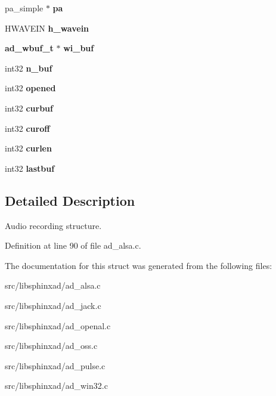 \begin{DoxyCompactItemize}
\item 
pa\-\_\-simple $\ast$ {\bfseries pa}\label{structad__rec__s_a8ebda5d453f68928e21548739f27ceb9}

\item 
H\-W\-A\-V\-E\-I\-N {\bfseries h\-\_\-wavein}\label{structad__rec__s_a79081fc333f54eff7afdc23404f3ae69}

\item 
{\bf ad\-\_\-wbuf\-\_\-t} $\ast$ {\bfseries wi\-\_\-buf}\label{structad__rec__s_a81d0d2d45fe558b7e7c5504680b15dc5}

\item 
int32 {\bfseries n\-\_\-buf}\label{structad__rec__s_acd8fe38386d84c3e954f2652577c0c7e}

\item 
int32 {\bfseries opened}\label{structad__rec__s_a8f1c8d2056486373a7d87c89e995b8f2}

\item 
int32 {\bfseries curbuf}\label{structad__rec__s_a1eb7456dc028152343c8d538195a8aa3}

\item 
int32 {\bfseries curoff}\label{structad__rec__s_a1c7d3d94fc97bb318cbfe4aa33088b62}

\item 
int32 {\bfseries curlen}\label{structad__rec__s_ab9d6eff8b29d0741ed3b4133a57174ca}

\item 
int32 {\bfseries lastbuf}\label{structad__rec__s_a30b13811b7b97765861b776e29d5d34c}

\end{DoxyCompactItemize}


\subsection{Detailed Description}
Audio recording structure. 

Definition at line 90 of file ad\-\_\-alsa.\-c.



The documentation for this struct was generated from the following files\-:\begin{DoxyCompactItemize}
\item 
src/libsphinxad/ad\-\_\-alsa.\-c\item 
src/libsphinxad/ad\-\_\-jack.\-c\item 
src/libsphinxad/ad\-\_\-openal.\-c\item 
src/libsphinxad/ad\-\_\-oss.\-c\item 
src/libsphinxad/ad\-\_\-pulse.\-c\item 
src/libsphinxad/ad\-\_\-win32.\-c\end{DoxyCompactItemize}

